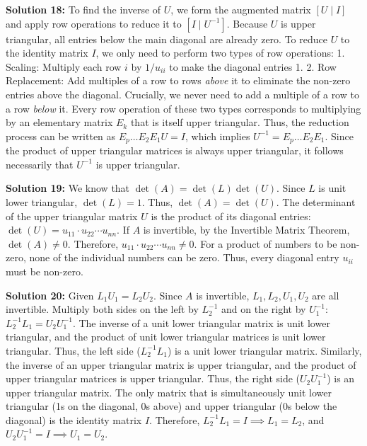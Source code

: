 \documentclass[11pt]{article}
\begin{document}
\vspace{0.5cm}
\textbf{Solution 18:}
To find the inverse of $U$, we form the augmented matrix $[U \mid I]$ and apply row operations to reduce it to $[I \mid U^{-1}]$.
Because $U$ is upper triangular, all entries below the main diagonal are already zero. To reduce $U$ to the identity matrix $I$, we only need to perform two types of row operations:
1. Scaling: Multiply each row $i$ by $1/u_{ii}$ to make the diagonal entries 1.
2. Row Replacement: Add multiples of a row to rows \textit{above} it to eliminate the non-zero entries above the diagonal.
Crucially, we never need to add a multiple of a row to a row \textit{below} it. Every row operation of these two types corresponds to multiplying by an elementary matrix $E_k$ that is itself upper triangular.
Thus, the reduction process can be written as $E_p \dots E_2 E_1 U = I$, which implies $U^{-1} = E_p \dots E_2 E_1$.
Since the product of upper triangular matrices is always upper triangular, it follows necessarily that $U^{-1}$ is upper triangular.

\vspace{0.5cm}
\textbf{Solution 19:}
We know that $\det(A) = \det(L)\det(U)$. Since $L$ is unit lower triangular, $\det(L) = 1$. Thus, $\det(A) = \det(U)$.
The determinant of the upper triangular matrix $U$ is the product of its diagonal entries: $\det(U) = u_{11} \cdot u_{22} \cdots u_{nn}$.
If $A$ is invertible, by the Invertible Matrix Theorem, $\det(A) \neq 0$.
Therefore, $u_{11} \cdot u_{22} \cdots u_{nn} \neq 0$.
For a product of numbers to be non-zero, none of the individual numbers can be zero. Thus, every diagonal entry $u_{ii}$ must be non-zero.

\vspace{0.5cm}
\textbf{Solution 20:}
Given $L_1 U_1 = L_2 U_2$. Since $A$ is invertible, $L_1, L_2, U_1, U_2$ are all invertible.
Multiply both sides on the left by $L_2^{-1}$ and on the right by $U_1^{-1}$:
$L_2^{-1} L_1 = U_2 U_1^{-1}$.
The inverse of a unit lower triangular matrix is unit lower triangular, and the product of unit lower triangular matrices is unit lower triangular. Thus, the left side ($L_2^{-1} L_1$) is a unit lower triangular matrix.
Similarly, the inverse of an upper triangular matrix is upper triangular, and the product of upper triangular matrices is upper triangular. Thus, the right side ($U_2 U_1^{-1}$) is an upper triangular matrix.
The only matrix that is simultaneously unit lower triangular (1s on the diagonal, 0s above) and upper triangular (0s below the diagonal) is the identity matrix $I$.
Therefore, $L_2^{-1} L_1 = I \implies L_1 = L_2$, and $U_2 U_1^{-1} = I \implies U_1 = U_2$.
\end{document}
